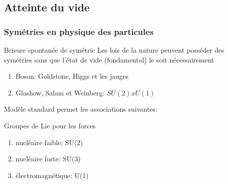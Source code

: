 \documentclass[handout]{beamer}
\begin{document}
\subsection{Atteinte du vide}
\begin{frame}
\frametitle{Symétries en physique des particules}
\begin{block}{Brisure spontanée de symétrie}
Les lois de la nature peuvent posséder des symétries sans que l'état de vide (fondamental) le soit nécessairement
\begin{enumerate}
\item Boson: Goldstone, Higgs et les jauges
\item Glashow, Salam et Weinberg: $SU(2)xU(1)$ 
\end{enumerate}
\end{block}
Modèle standard permet les associations suivantes:
\begin{block}{Groupes de Lie pour les forces}
\begin{enumerate}
\item nucléaire faible: SU(2)
\item nucléaire forte: SU(3)
\item électromagnétique: U(1)
\end{enumerate}
\end{block}
\end{frame}
\end{document}
